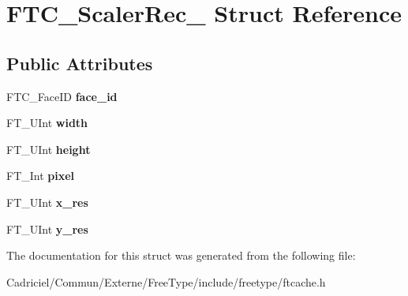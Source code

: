 \hypertarget{struct_f_t_c___scaler_rec__}{}\section{F\+T\+C\+\_\+\+Scaler\+Rec\+\_\+ Struct Reference}
\label{struct_f_t_c___scaler_rec__}
\subsection*{Public Attributes}
\begin{DoxyCompactItemize}
\item 
F\+T\+C\+\_\+\+Face\+ID {\bfseries face\+\_\+id}\hypertarget{struct_f_t_c___scaler_rec___a8e963aa619409e646558fe7aa272e81f}{}\label{struct_f_t_c___scaler_rec___a8e963aa619409e646558fe7aa272e81f}

\item 
F\+T\+\_\+\+U\+Int {\bfseries width}\hypertarget{struct_f_t_c___scaler_rec___a11e13d907ca4661bf7c1d98fffecf321}{}\label{struct_f_t_c___scaler_rec___a11e13d907ca4661bf7c1d98fffecf321}

\item 
F\+T\+\_\+\+U\+Int {\bfseries height}\hypertarget{struct_f_t_c___scaler_rec___a9b3a9b4d7148bbaa4daaae1e1fbb2dbc}{}\label{struct_f_t_c___scaler_rec___a9b3a9b4d7148bbaa4daaae1e1fbb2dbc}

\item 
F\+T\+\_\+\+Int {\bfseries pixel}\hypertarget{struct_f_t_c___scaler_rec___ab78868341e2d66f17e6f1d77e9e054d2}{}\label{struct_f_t_c___scaler_rec___ab78868341e2d66f17e6f1d77e9e054d2}

\item 
F\+T\+\_\+\+U\+Int {\bfseries x\+\_\+res}\hypertarget{struct_f_t_c___scaler_rec___a886c7c1230dc5d5e6b3fc32d06274752}{}\label{struct_f_t_c___scaler_rec___a886c7c1230dc5d5e6b3fc32d06274752}

\item 
F\+T\+\_\+\+U\+Int {\bfseries y\+\_\+res}\hypertarget{struct_f_t_c___scaler_rec___accb53c7a9aeebb41c05f48d14d3dfe71}{}\label{struct_f_t_c___scaler_rec___accb53c7a9aeebb41c05f48d14d3dfe71}

\end{DoxyCompactItemize}


The documentation for this struct was generated from the following file\+:\begin{DoxyCompactItemize}
\item 
Cadriciel/\+Commun/\+Externe/\+Free\+Type/include/freetype/ftcache.\+h\end{DoxyCompactItemize}

